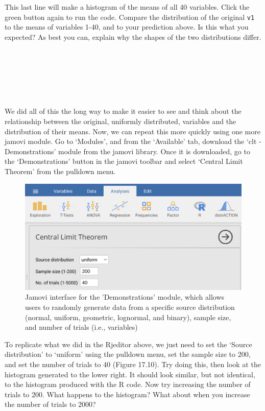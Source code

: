 \documentclass[
]{scrbook}
\begin{document}
This last line will make a histogram of the means of all 40 variables.
Click the green button again to run the code.
Compare the distribution of the original \texttt{v1} to the means of variables 1-40, and to your prediction above.
Is this what you expected?
As best you can, explain why the shapes of the two distributions differ.

\begin{verbatim}






\end{verbatim}

We did all of this the long way to make it easier to see and think about the relationship between the original, uniformly distributed, variables and the distribution of their means.
Now, we can repeat this more quickly using one more jamovi module.
Go to `Modules', and from the `Available' tab, download the `clt - Demonstrations' module from the jamovi library.
Once it is downloaded, go to the `Demonstrations' button in the jamovi toolbar and select `Central Limit Theorem' from the pulldown menu.

\begin{figure}
\includegraphics[width=0.8\linewidth]{img/jamovi_clt} \caption{Jamovi interface for the 'Demonstrations' module, which allows users to randomly generate data from a specific source distribution (normal, uniform, geometric, lognormal, and binary), sample size, and number of trials (i.e., variables)}\label{fig:unnamed-chunk-83}
\end{figure}

To replicate what we did in the Rjeditor above, we just need to set the `Source distribution' to `uniform' using the pulldown menu, set the sample size to 200, and set the number of trials to 40 (Figure 17.10).
Try doing this, then look at the histogram generated to the lower right.
It should look similar, but not identical, to the histogram produced with the R code.
Now try increasing the number of trials to 200.
What happens to the histogram?
What about when you increase the number of trials to 2000?
\end{document}
